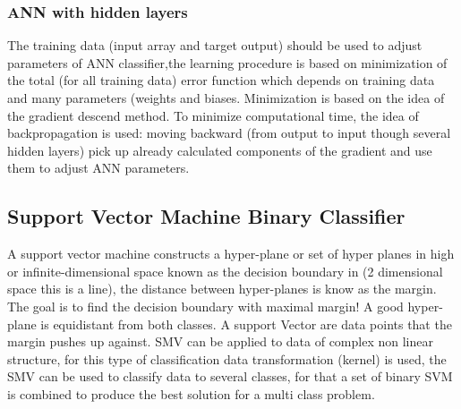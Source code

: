 \subsubsection{ANN with hidden layers}
 The training data (input array and target output) should be
used to adjust parameters of ANN classifier,the learning procedure is based on minimization of the
total (for all training data) error function which depends on
training data and many parameters (weights and biases. Minimization is based on the idea of the gradient descend method. To minimize computational time, the idea of
backpropagation is used: moving backward (from output to input though several hidden layers) pick up already calculated components of the gradient and use them to
adjust ANN parameters.
\subsection{Support Vector Machine Binary Classifier}
A support vector machine constructs a hyper-plane or set of hyper planes in high or infinite-dimensional space known as the decision boundary in (2 dimensional space this is a line), the distance between hyper-planes is know as the margin. The goal is to find the decision boundary with maximal margin! A good hyper-plane is equidistant from both classes. A support Vector are data points that the margin pushes up against. 
SMV can be applied to data of complex non linear structure, for this type of classification data transformation (kernel) is used, the SMV can be used to classify data to several classes, for that a set of binary SVM is combined to produce the best solution for a multi class problem.